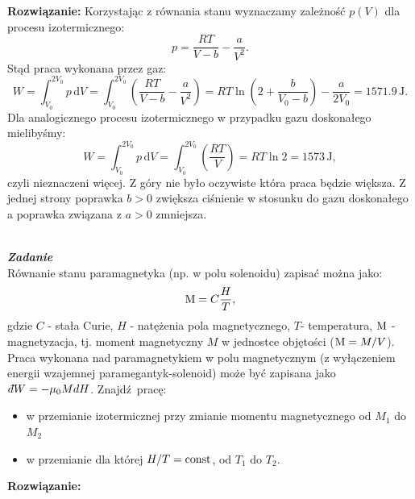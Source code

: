 \documentclass[11pt,a4paper]{article}
\newcounter{zadanie}\newcommand{\zadanie}[1][]{\addtocounter{zadanie}{1} ~\\  {\bf \emph{Zadanie \arabic{zadanie} #1 }} \\}
\newcommand{\dbar}{{\mkern3mu\mathchar'26\mkern-12mu d}}
\renewcommand{\t}[1]{\textrm{#1}}
\begin{document}
\vskip 10pt
\textbf{Rozwiązanie:}
Korzystając z równania stanu wyznaczamy zależność $p(V)$ dla procesu izotermicznego:
$$
p = \frac{R T}{V-b} - \frac{a}{V^2}.
$$
Stąd praca wykonana przez gaz:
$$
W = \int_{V_0}^{2 V_0} p \,\t{d}V = 
\int_{V_0}^{2V_0}\left(\frac{R T}{V-b} - \frac{a}{V^2}\right) = 
R T \ln \left(2 + \frac{b}{V_0 - b}\right) - \frac{a}{2V_0} = 1571.9\, \t{J}.
$$
Dla analogicznego procesu izotermicznego w przypadku gazu doskonałego mielibyśmy:
$$
W = \int_{V_0}^{2 V_0} p \,\t{d}V = 
\int_{V_0}^{2V_0}\left(\frac{R T}{V}\right) =  
RT \ln 2 =  1573\, \t{J},
$$
czyli nieznaczeni więcej. Z góry nie było oczywiste która praca będzie większa. Z jednej strony poprawka $b>0$ zwiększa ciśnienie w stosunku do gazu doskonałego a poprawka związana z $a>0$ zmniejsza.
\newpage
\zadanie
Równanie stanu paramagnetyka (np. w polu solenoidu) zapisać można jako:
\[  {\rm M}= C \frac{H}{T}, \]
gdzie $C$ - stała Curie, $H$ - natężenia pola magnetycznego, $T$- temperatura,
$\rm M$ - magnetyzacja, tj. moment magnetyczny $M$ w jednostce objętości (${\rm M}=M/V$).
Praca wykonana nad paramagnetykiem w polu magnetycznym
 (z wyłączeniem energii wzajemnej paramegantyk-solenoid) może być zapisana jako
 $\dbar W = -\mu_0 M dH$.
Znajdź pracę: 
\begin{itemize}
\item w przemianie izotermicznej przy zmianie momentu magnetycznego od $M_1$ do $M_2$
\item w przemianie dla której $H/T={\rm const}$, od $T_1$ do $T_2$. 
\end{itemize}

\vskip 10pt
\textbf{Rozwiązanie:}
\end{document}
